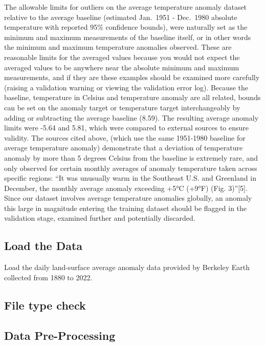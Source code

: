 \documentclass[
  letterpaper,
  DIV=11,
  numbers=noendperiod]{scrartcl}
\begin{document}
The allowable limits for outliers on the average temperature anomaly
dataset relative to the average baseline (estimated Jan.~1951 -
Dec.~1980 absolute temperature with reported 95\% confidence bounds),
were naturally set as the minimum and maximum measurements of the
baseline itself, or in other words the minimum and maximum temperature
anomalies observed. These are reasonable limits for the averaged values
because you would not expect the averaged values to be anywhere near the
absolute minimum and maximum measurements, and if they are these
examples should be examined more carefully (raising a validation warning
or viewing the validation error log). Because the baseline, temperature
in Celsius and temperature anomaly are all related, bounds can be set on
the anomaly target or temperature target interchangeably by adding or
subtracting the average baseline (8.59). The resulting average anomaly
limits were -5.64 and 5.81, which were compared to external sources to
ensure validity. The sources cited above, (which use the same 1951-1980
baseline for average temperature anomaly) demonstrate that a deviation
of temperature anomaly by more than 5 degrees Celsius from the baseline
is extremely rare, and only observed for certain monthly averages of
anomaly temperature taken across specific regions: ``It was unusually
warm in the Southeast U.S. and Greenland in December, the monthly
average anomaly exceeding +5°C (+9°F) (Fig. 3)''{[}5{]}. Since our
dataset involves average temperature anomalies globally, an anomaly this
large in magnitude entering the training dataset should be flagged in
the validation stage, examined further and potentially discarded.

\subsection{Load the Data}\label{load-the-data}

Load the daily land-surface average anomaly data provided by Berkeley
Earth collected from 1880 to 2022.

\subsection{File type check}\label{file-type-check}

\subsection{Data Pre-Processing}\label{data-pre-processing}
\end{document}
